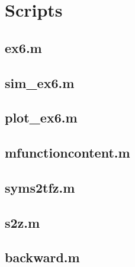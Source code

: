 \section*{Scripts}
    \subsection*{ex6.m}
    \label{subsec:ex6}
    

    \subsection*{sim\_ex6.m}
    \label{subsec:simex6}
    

    \subsection*{plot\_ex6.m}
    \label{subsec:plotex6}
    
    
    \subsection*{mfunctioncontent.m}
    \label{subsec:mfunctioncontent}
    

    \subsection*{syms2tfz.m}
    \label{subsec:syms2tfz}
    
    
    \subsection*{s2z.m}
    \label{subsec:s2z}
    
    
    \subsection*{backward.m}
    \label{subsec:backward}
    
    
